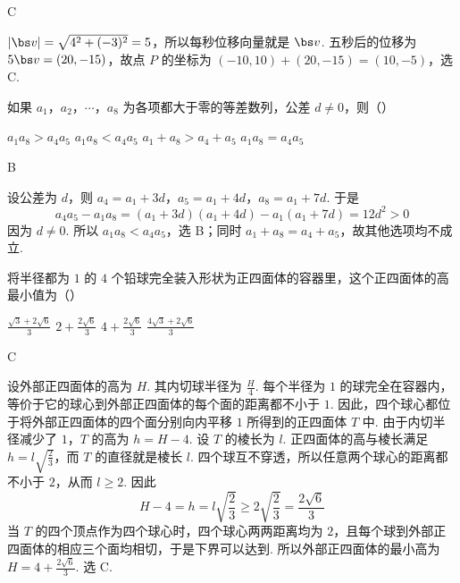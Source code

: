 \begin{answer}
C
\end{answer}

\begin{solution}
\(\lvert\bs v\rvert=\sqrt{4^2+(-3)^2}=5\)，所以每秒位移向量就是 \(\bs v\). 五秒后的位移为 \(5\bs v=(20,-15)\)，故点 \(P\) 的坐标为 \((-10,10)+(20,-15)=(10,-5)\)，选 C.
\end{solution}

\begin{problem}
如果 \(a_{1}\)，\(a_{2}\)，\(\cdots\)，\(a_{8}\) 为各项都大于零的等差数列，公差 \(d \neq 0\)，则（\quad）

\choices
    {\(a_{1}a_{8} > a_{4}a_{5}\)}
    {\(a_{1}a_{8} < a_{4}a_{5}\)}
    {\(a_{1} + a_{8} > a_{4} + a_{5}\)}
    {\(a_{1}a_{8} = a_{4}a_{5}\)}
\end{problem}

\begin{answer}
B
\end{answer}

\begin{solution}
设公差为 \(d\)，则 \(a_4=a_1+3d\)，\(a_5=a_1+4d\)，\(a_8=a_1+7d\). 于是
\[
a_4a_5-a_1a_8=(a_1+3d)(a_1+4d)-a_1(a_1+7d)=12d^2>0
\]
因为 \(d\neq0\). 所以 \(a_1a_8<a_4a_5\)，选 B；同时 \(a_1+a_8=a_4+a_5\)，故其他选项均不成立.
\end{solution}

\begin{problem}
将半径都为 \(1\) 的 \(4\) 个铅球完全装入形状为正四面体的容器里，这个正四面体的高最小值为（\quad）

\choices
    {\(\frac{\sqrt{3} + 2\sqrt{6}}{3}\)}
    {\(2 + \frac{2\sqrt{6}}{3}\)}
    {\(4 + \frac{2\sqrt{6}}{3}\)}
    {\(\frac{4\sqrt{3} + 2\sqrt{6}}{3}\)}
\end{problem}

\begin{answer}
C
\end{answer}

\begin{solution}
设外部正四面体的高为 \(H\). 其内切球半径为 \(\frac{H}{4}\). 每个半径为 \(1\) 的球完全在容器内，等价于它的球心到外部正四面体的每个面的距离都不小于 \(1\). 因此，四个球心都位于将外部正四面体的四个面分别向内平移 \(1\) 所得到的正四面体 \(T\) 中. 由于内切半径减少了 \(1\)，\(T\) 的高为
\(h=H-4\).
设 \(T\) 的棱长为 \(l\). 正四面体的高与棱长满足 \(h=l\sqrt{\frac{2}{3}}\)，而 \(T\) 的直径就是棱长 \(l\). 四个球互不穿透，所以任意两个球心的距离都不小于 \(2\)，从而 \(l\geqslant2\). 因此
\[
H-4=h=l\sqrt{\frac{2}{3}}\geqslant2\sqrt{\frac{2}{3}}=\frac{2\sqrt{6}}{3}
\]
当 \(T\) 的四个顶点作为四个球心时，四个球心两两距离均为 \(2\)，且每个球到外部正四面体的相应三个面均相切，于是下界可以达到. 所以外部正四面体的最小高为
\(H=4+\frac{2\sqrt{6}}{3}\).
选 C.
\end{solution}

